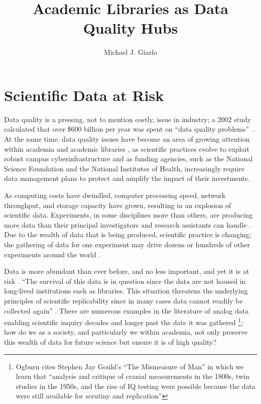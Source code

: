 \documentclass[jou,12pt]{apa6}
\title{Academic Libraries as Data Quality Hubs}
\author{Michael J. Giarlo}
\affiliation{Penn State University}
\begin{document}
\maketitle

\section{Scientific Data at Risk}
Data quality is a pressing, not to mention costly, issue in industry;
a 2002 study \cite{russom:case} calculated that over \$600 billion per
year was spent on ``data quality problems''\ 
\cite{eckerson:bottomline}.  At the same time, data quality issues
have become an area of growing attention within academia and academic
libraries \cite{heidorn:libraries,arl:stewardship,ogburn:imperative,jisc:deluge},
as scientific practices evolve to exploit robust campus
cyberinfrastructure and as funding agencies, such as the National
Science Foundation and the National Institutes of Health, increasingly
require data management plans to protect and amplify the impact of
their investments.

As computing costs have dwindled, computer processing speed, network
throughput, and storage capacity have grown, resulting in an explosion
of scientific data.  Experiments, in some disciplines more than
others, are producing more data than their principal investigators and
research assistants can handle \cite{adams:galaxyzoo}. Due to the
wealth of data that is being produced, scientific practice is
changing; the gathering of data for one experiment may drive dozens or
hundreds of other experiments around the world \cite{jisc:deluge}.

Data is more abundant than ever before, and no less important, and yet
it is at risk \cite{ogburn:imperative,heidorn:libraries}.  ``The
survival of this data is in question since the data are not housed in
long-lived institutions such as libraries. This situation threatens
the underlying principles of scientific replicability since in many
cases data cannot readily be collected again''
\cite{heidorn:libraries}. There are numerous examples in the
literature of analog data enabling scientific inquiry decades and
longer past the date it was gathered \footnote{Ogburn
  \cite{ogburn:imperative} cites Stephen Jay Gould's ``The Mismeasure
  of Man'' in which we learn that ``analysis and critique of cranial
  measurements in the 1800s, twin studies in the 1950s, and the rise
  of IQ testing were possible because the data were still available
  for scrutiny and replication''}; how do we as a society, and
particularly we within academia, not only preserve this wealth of data
for future science but ensure it is of high quality?
\end{document}
